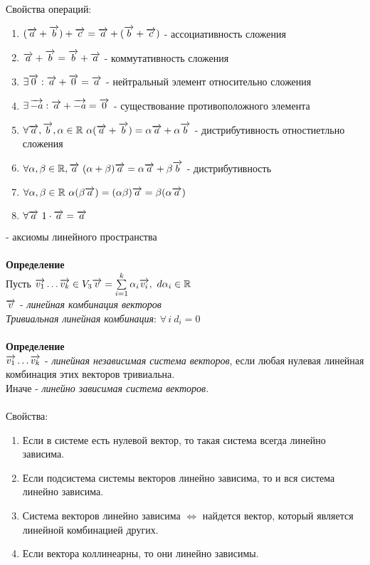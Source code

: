 \documentclass[12pt]{article}
\begin{document}
Свойства операций:
\begin{enumerate}
    \item $(\overrightarrow{a}+\overrightarrow{b})+\overrightarrow{c} = \overrightarrow{a}+(\overrightarrow{b}+\overrightarrow{c})$ - ассоциативность сложения
    \item $\overrightarrow{a}+\overrightarrow{b} = \overrightarrow{b}+\overrightarrow{a}$ - коммутативность сложения
    \item $\exists \overrightarrow{0}: \overrightarrow{a}+\overrightarrow{0} = \overrightarrow{a}$ - нейтральный элемент относительно сложения
    \item $\exists\, \overrightarrow{-a}: \overrightarrow{a}+\overrightarrow{-a} = \overrightarrow{0}$ - существование противоположного элемента
    \item $\forall \vect{a},\vect{b}, \alpha \in \mathbb{R}\ \alpha(\vect{a}+\vect{b})=\alpha\vect{a}+\alpha\vect{b}$ - дистрибутивность отностиетльно сложения
    \item $\forall \alpha, \beta \in \mathbb{R}, \overrightarrow{a}\ (\alpha+\beta)\overrightarrow{a} = \alpha\overrightarrow{a}+\beta\overrightarrow{b}$ - дистрибутивность
    \item $\forall \alpha,\beta \in \mathbb{R}\  \alpha(\beta\overrightarrow{a})=(\alpha\beta)\overrightarrow{a}=\beta(\alpha\overrightarrow{a})$
    \item $\forall\vect{a}\ 1\cdot\vect{a}=\vect{a}$
\end{enumerate} - аксиомы линейного пространства\\\\
\textbf{Определение}\\
Пусть $\overrightarrow{v_1}\ldots\overrightarrow{v_k} \in V_3\\
\overrightarrow{v}=\sum\limits_{i=1}^{k}\alpha_i\overrightarrow{v_i},\ d\alpha_i\in \mathbb{R}$\\
$\overrightarrow{v}$ - \textit{линейная комбинация векторов}\\
\textit{Тривиальная линейная комбинация}: $\forall\,i\ d_i=0$\\\\
\textbf{Определение}\\
$\overrightarrow{v_1}\ldots\overrightarrow{v_k}$ - \textit{линейная независимая система векторов}, если любая нулевая линейная комбинация этих векторов тривиальна.\\
Иначе - \textit{линейно зависимая система векторов}.\\\\
Свойства:
\begin{enumerate}
    \item Если в системе есть нулевой вектор, то такая система всегда линейно зависима.
    \item Если подсистема системы векторов линейно зависима, то и вся система линейно зависима.
    \item Система векторов линейно зависима $\Leftrightarrow$ найдется вектор, который является линейной комбинацией других.
    \item Если вектора коллинеарны, то они линейно зависимы.
\end{enumerate}
\end{document}
